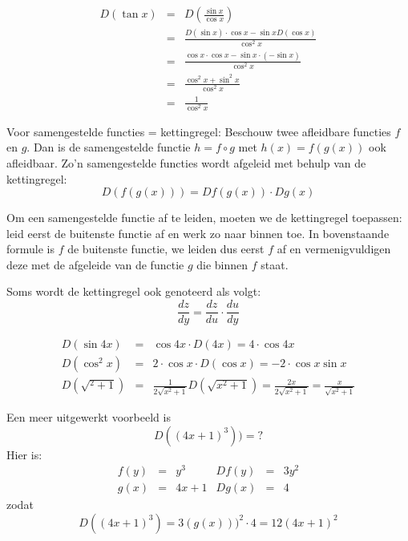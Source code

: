 \begin{voorbeeld}
	\begin{eqnarray*}
		D(\tan x) &=& D(\frac{\sin x}{\cos x}) \\
		&=& \frac{D(\sin x) \cdot \cos x-\sin x D(\cos x)}{\cos ^2 x} \\
		&=& \frac{\cos x \cdot \cos x-\sin x \cdot (- \sin x)}{\cos ^2 x}\\
		&=& \frac{\cos^2 x + \sin^2 x}{\cos ^2 x} \\
		&=& \frac{1}{\cos ^2 x}
	\end{eqnarray*}
\end{voorbeeld}

\begin{ftrekenregel}
	Voor samengestelde functies = kettingregel:
	Beschouw twee afleidbare functies $f$ en $g$. Dan is de samengestelde functie $h=f \circ g$ met $h(x)=f(g(x))$ ook afleidbaar.
	Zo'n samengestelde functies wordt afgeleid met behulp van de kettingregel:
	\begin{equation*}
	D(f(g(x))) = Df(g(x)) \cdot Dg(x)
	\end{equation*}
\end{ftrekenregel}

Om een samengestelde functie af te leiden, moeten we de kettingregel toepassen: leid eerst de buitenste functie af en werk zo naar binnen toe. In bovenstaande formule is $f$ de buitenste functie, we leiden dus eerst $f$ af en vermenigvuldigen deze met de afgeleide van de functie $g$ die binnen $f$ staat.

Soms wordt de kettingregel ook genoteerd als volgt:
\begin{equation*}
\frac{dz}{dy} = \frac{dz}{du} \cdot \frac{du}{dy}
\end{equation*}

\begin{voorbeeld}
\begin{eqnarray*}
D(\sin 4x) &=& \cos 4x \cdot D(4x) = 4 \cdot \cos 4x \\
D(\cos^2 x) &=& 2 \cdot \cos x \cdot D(\cos x) = -2 \cdot \cos x \sin x \\
D(\sqrt{^2+1}) &=& \frac{1}{2\sqrt{x^2+1}}D(\sqrt{x^2+1})=\frac{2x}{2\sqrt{x^2+1}} =\frac{x}{\sqrt{x^2+1}}
\end{eqnarray*}
\end{voorbeeld}

\begin{voorbeeld}
	Een meer uitgewerkt voorbeeld is 
	\[D((4x+1)^3))=?\]
	Hier is:
	\[
	\begin{array}{rclrcl}
	f(y)&=&y^3 & Df(y)&=&3y^2 \\
	g(x)&=&4x+1 & Dg(x)&=&4 
	\end{array}
	\]
	zodat 
	\[D((4x+1)^3)=3(g(x)))^2 \cdot 4 = 12(4x+1)^2\]
\end{voorbeeld}

